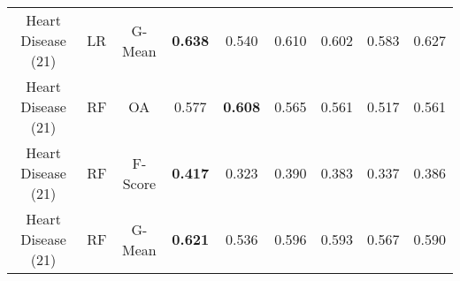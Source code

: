\begin{longtable}{ccccccccc}
Heart Disease (21) &         LR &  G-Mean & \textbf{0.638} &          0.540 &          0.610 &          0.602 &          0.583 &          0.627 \\
Heart Disease (21) &         RF &      OA &          0.577 & \textbf{0.608} &          0.565 &          0.561 &          0.517 &          0.561 \\
Heart Disease (21) &         RF & F-Score & \textbf{0.417} &          0.323 &          0.390 &          0.383 &          0.337 &          0.386 \\
Heart Disease (21) &         RF &  G-Mean & \textbf{0.621} &          0.536 &          0.596 &          0.593 &          0.567 &          0.590 \\
\end{longtable}
